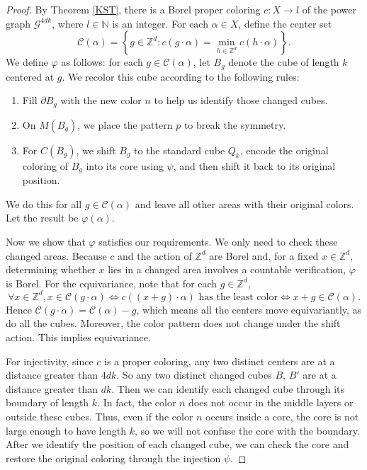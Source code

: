 \documentclass[10pt,a4paper]{amsart}
\begin{document}
\begin{proof}
By Theorem \ref{KST}, there is a Borel proper coloring $c:X\longrightarrow l$ of the power graph $\mathcal{G}^{4dk}$, where $l\in\mathbb{N}$ is an integer. For each $\alpha\in X$, define the center set
\[
\mathcal{C}(\alpha)=\left\{g\in\mathbb{Z}^d:c(g\cdot\alpha)=\min_{h\in\mathbb{Z}^d}c(h\cdot\alpha)\right\}.
\]
We define $\varphi$ as follows: for each $g\in \mathcal{C}(\alpha)$, let $B_g$ denote the cube of length $k$ centered at $g$. We recolor this cube according to the following rules:
\begin{enumerate}
    \item Fill $\partial B_g$ with the new color $n$ to help us identify those changed cubes.
    \item On $M(B_g)$, we place the pattern $p$ to break the symmetry.
    \item For $C(B_g)$, we shift $B_g$ to the standard cube $Q_k$, encode the original coloring of $B_g$ into its core using $\psi$,
and then shift it back to its original position.
\end{enumerate}

We do this for all $g\in \mathcal{C}(\alpha)$ and leave all other areas with their original colors. Let the result be $\varphi(\alpha)$. 

Now we show that $\varphi$ satisfies our requirements. We only need to check these changed areas. Because $c$ and the action of ${\mathbb{Z}}^d$ are Borel and, for a fixed $x\in \mathbb{Z}^d$, determining whether $x$ lies in a changed area involves a countable verification, $\varphi$ is Borel. For the equivariance, note that for each $g\in\mathbb{Z}^d$, 
\[\forall x\in {\mathbb{Z}}^d, x\in \mathcal{C}(g\cdot\alpha)\iff c((x+g)\cdot\alpha)\text{ has the least color}\iff x+g\in \mathcal{C}(\alpha).\]
 Hence $\mathcal{C}(g\cdot\alpha)=\mathcal{C}(\alpha)-g$, which means all the centers move equivariantly, as do all the cubes. Moreover, the color pattern does not change under the shift action. This implies equivariance.

 For injectivity, since $c$ is a proper coloring, any two distinct centers are at a distance greater than $4dk$. So any two distinct changed cubes $B$, $B'$ are at a distance greater than $dk$. Then we can identify each changed cube through its boundary of length $k$. In fact, the color $n$ does not occur in the middle layers or outside these cubes. Thus, even if the color $n$ occurs inside a core, the core is not large enough to have length $k$, so we will not confuse the core with the boundary. After we identify the position of each changed cube,  we can check the core and restore the original coloring through the injection $\psi$.
 

\end{proof}
\end{document}
